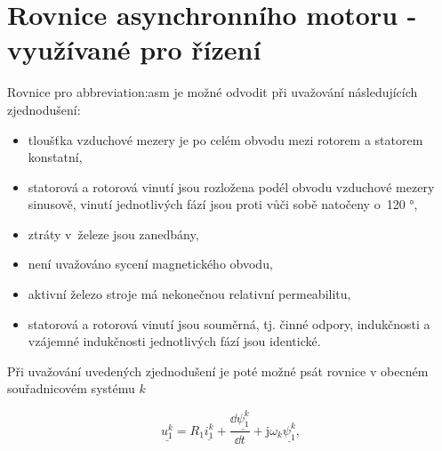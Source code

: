 \documentclass[a4paper, twoside, 11pt]{article}
\begin{document}


\tableofcontents
\newpage%
\flushbottom %
\newpage
\vspace{0pt}
\listoffigures %
\flushbottom %
\newpage
\listoftables
\flushbottom
\newpage


\null\newpage
\setcounter{page}{1}

\section{Rovnice asynchronního motoru - využívané pro řízení}
Rovnice pro \gls{abbreviation:asm} je možné odvodit při uvažování následujících zjednodušení:

\begin{itemize}
    \item tloušťka vzduchové mezery je po celém obvodu mezi rotorem a statorem konstatní,
    \item statorová a rotorová vinutí jsou rozložena podél obvodu vzduchové mezery sinusově, vinutí jednotlivých fází jsou proti vůči sobě natočeny o~120 °,
    \item ztráty v~železe jsou zanedbány,
    \item není uvažováno sycení magnetického obvodu,
    \item aktivní železo stroje má nekonečnou relativní permeabilitu,
    \item statorová a rotorová vinutí jsou souměrná, tj. činné odpory, indukčnosti a vzájemné indukčnosti jednotlivých fází jsou identické.
\end{itemize}

Při uvažování uvedených zjednodušení je poté možné psát rovnice v obecném souřadnicovém systému $k$

 \begin{equation}
     \underline{u_{1}^{k}} = R_1 \underline{i_1^{k}} + \frac{\dd{\underline{\psi_1^{k}}}}{\dd{t}} + \text{j} \omega_k \underline{\psi_1^{k}},
    \end{equation}
\end{document}
